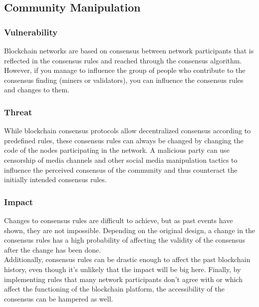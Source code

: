 \documentclass[11pt,a4paper,draft]{article}
\begin{document}
\subsection{Community Manipulation}

\subsubsection{Vulnerability}

Blockchain networks are based on consensus between network participants that is reflected in the consensus rules and reached through the consensus algorithm. However, if you manage to influence the group of people who contribute to the consensus finding (miners or validators), you can influence the consensus rules and changes to them.\\

\subsubsection{Threat}

While blockchain consensus protocols allow decentralized consensus according to predefined rules, these consensus rules can always be changed by changing the code of the nodes participating in the network. A malicious party can use censorship of media channels and other social media manipulation tactics to influence the perceived consensus of the community and thus counteract the initially intended consensus rules.\\

\subsubsection{Impact}

Changes to consensus rules are difficult to achieve, but as past events have shown, they are not impossible. Depending on the original design, a change in the consensus rules has a high probability of affecting the validity of the consensus after the change has been done.\\

Additionally, consensus rules can be drastic enough to affect the past blockchain history, even though it's unlikely that the impact will be big here. Finally, by implementing rules that many network participants don't agree with or which affect the functioning of the blockchain platform, the accessibility of the consensus can be hampered as well.\\
\end{document}
